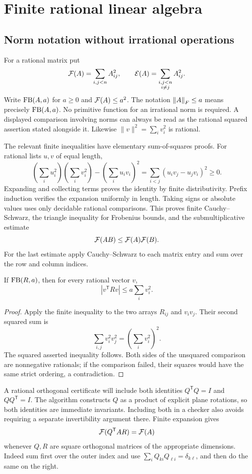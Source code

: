 \section{Finite rational linear algebra}
\label{sec:linear}

\subsection{Norm notation without irrational operations}

For a rational matrix put
\[
 \mathcal F(A)=\sum_{i,j<n} A_{ij}^2,
 \qquad \mathcal E(A)=\sum_{\substack{i,j<n\\i\ne j}}A_{ij}^2.
\]
Write $\operatorname{FB}(A,a)$ for $a\ge0$ and $\mathcal F(A)\le a^2$. The notation $\left\lVert A\right\rVert_F\le a$ means precisely $\operatorname{FB}(A,a)$. No primitive function for an irrational norm is required. A displayed comparison involving norms can always be read as the rational squared assertion stated alongside it. Likewise $\|v\|^2=\sum_i v_i^2$ is rational.

The relevant finite inequalities have elementary sum-of-squares proofs. For rational lists $u,v$ of equal length,
\[
 \left(\sum_i u_i^2\right)\left(\sum_i v_i^2\right)
 -\left(\sum_i u_iv_i\right)^2
 =\sum_{i<j}(u_iv_j-u_jv_i)^2\ge0.
\]
Expanding and collecting terms proves the identity by finite distributivity. Prefix induction verifies the expansion uniformly in length. Taking signs or absolute values uses only decidable rational comparisons. This proves finite Cauchy--Schwarz, the triangle inequality for Frobenius bounds, and the submultiplicative estimate
\[
 \mathcal F(AB)\le\mathcal F(A)\mathcal F(B).
\]
For the last estimate apply Cauchy--Schwarz to each matrix entry and sum over the row and column indices.

\begin{lemma}
\label{lem:qform}
If $\operatorname{FB}(R,a)$, then for every rational vector $v$,
\[
 |v^{\mathsf T}Rv|\le a\sum_i v_i^2.
\]
\end{lemma}
\begin{proof}
Apply the finite inequality to the two arrays $R_{ij}$ and $v_iv_j$. Their second squared sum is
\[
 \sum_{i,j}v_i^2v_j^2=\left(\sum_i v_i^2\right)^2.
\]
The squared asserted inequality follows. Both sides of the unsquared comparison are nonnegative rationals; if the comparison failed, their squares would have the same strict ordering, a contradiction.
\end{proof}

A rational orthogonal certificate will include both identities
$Q^{\mathsf T}Q=I$ and $QQ^{\mathsf T}=I$. The algorithm constructs $Q$ as a product of explicit plane rotations, so both identities are immediate invariants. Including both in a checker also avoids requiring a separate invertibility argument there. Finite expansion gives
\[
 \mathcal F(Q^{\mathsf T}AR)=\mathcal F(A)
\]
whenever $Q,R$ are square orthogonal matrices of the appropriate dimensions. Indeed sum first over the outer index and use $\sum_i Q_{ki}Q_{\ell i}=\delta_{k\ell}$, and then do the same on the right.

